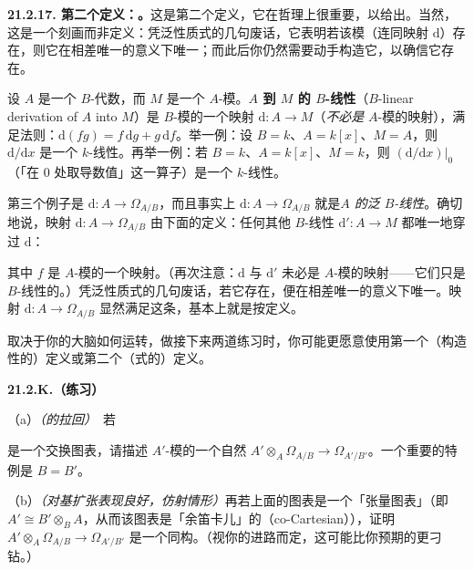 \textbf{21.2.17. 第二个定义：\trUniversalProperty。}\quad 这是第二个定义，它在哲理上很重要，以\trUniversalProperty{}给出。当然，这是一个刻画而非定义：凭泛性质式的几句废话，它表明若该模（连同映射 $\mathrm{d}$）存在，则它在相差唯一\trIsomorphism{}的意义下唯一；而此后你仍然需要动手构造它，以确信它存在。

设 $A$ 是一个 $B$-代数，而 $M$ 是一个 $A$-模。\textbf{$A$ 到 $M$ 的 $B$-线性\trDerivation}（$B$-linear derivation of $A$ into $M$）是 $B$-模的一个映射 $\mathrm{d}\colon A\to M$（\emph{不必是} $A$-模的映射），满足\trLeibniz{}法则：$\mathrm{d}(fg)=f\,\mathrm{d}g+g\,\mathrm{d}f$。举一例：设 $B=k$、$A=k[x]$、$M=A$，则 $\mathrm{d}/\mathrm{d}x$ 是一个 $k$-线性\trDerivation。再举一例：若 $B=k$、$A=k[x]$、$M=k$，则 $(\mathrm{d}/\mathrm{d}x)|_0$（「在 $0$ 处取导数值」这一算子）是一个 $k$-线性\trDerivation。

第三个例子是 $\mathrm{d}\colon A\to\Omega_{A/B}$，而且事实上 $\mathrm{d}\colon A\to\Omega_{A/B}$ 就是\emph{$A$ 的泛 $B$-线性\trDerivation}。确切地说，映射 $\mathrm{d}\colon A\to\Omega_{A/B}$ 由下面的\trUniversalProperty{}定义：任何其他 $B$-线性\trDerivation{} $\mathrm{d}'\colon A\to M$ 都唯一地穿过 $\mathrm{d}$：
其中 $f$ 是 $A$-模的一个映射。（再次注意：$\mathrm{d}$ 与 $\mathrm{d}'$ 未必是 $A$-模的映射——它们只是 $B$-线性的。）凭泛性质式的几句废话，若它存在，便在相差唯一\trIsomorphism{}的意义下唯一。映射 $\mathrm{d}\colon A\to\Omega_{A/B}$ 显然满足这条\trUniversalProperty，基本上就是按定义。

取决于你的大脑如何运转，做接下来两道练习时，你可能更愿意使用第一个（构造性的）定义或第二个（\trUniversalProperty{}式的）定义。

\textbf{21.2.K.（练习）}

（a）\emph{（\trDifferential{}的拉回）}\ 若
是一个交换图表，请描述 $A'$-模的一个自然\trHomomorphism{} $A'\otimes_A\Omega_{A/B}\to\Omega_{A'/B'}$。一个重要的特例是 $B=B'$。

（b）\emph{（\trDifferential{}对基扩张表现良好，仿射情形）}\quad 再若上面的图表是一个「张量图表」（即 $A'\cong B'\otimes_B A$，从而该图表是「余笛卡儿」的（co-Cartesian）），证明 $A'\otimes_A\Omega_{A/B}\to\Omega_{A'/B'}$ 是一个同构。（视你的进路而定，这可能比你预期的更刁钻。）

